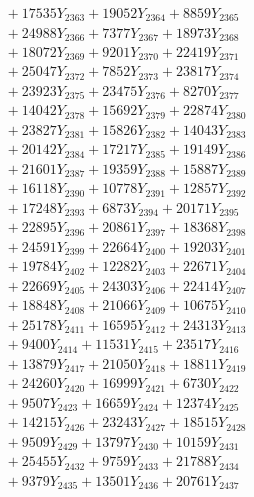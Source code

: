 \documentclass[a4paper,10pt]{article}
\begin{document}
{\begin{align}
&\;  + 17535 Y_{2363} + 19052 Y_{2364} + 8859 Y_{2365} \\[0.3ex]
&\;  + 24988 Y_{2366} + 7377 Y_{2367} + 18973 Y_{2368} \\[0.5ex]\allowbreak
&\;  + 18072 Y_{2369} + 9201 Y_{2370} + 22419 Y_{2371} \\[0.3ex]
&\;  + 25047 Y_{2372} + 7852 Y_{2373} + 23817 Y_{2374} \\[0.3ex]
&\;  + 23923 Y_{2375} + 23475 Y_{2376} + 8270 Y_{2377} \\[0.3ex]
&\;  + 14042 Y_{2378} + 15692 Y_{2379} + 22874 Y_{2380} \\[0.3ex]
&\;  + 23827 Y_{2381} + 15826 Y_{2382} + 14043 Y_{2383} \\[0.3ex]
&\;  + 20142 Y_{2384} + 17217 Y_{2385} + 19149 Y_{2386} \\[0.3ex]
&\;  + 21601 Y_{2387} + 19359 Y_{2388} + 15887 Y_{2389} \\[0.3ex]
&\;  + 16118 Y_{2390} + 10778 Y_{2391} + 12857 Y_{2392} \\[0.3ex]
&\;  + 17248 Y_{2393} + 6873 Y_{2394} + 20171 Y_{2395} \\[0.3ex]
&\;  + 22895 Y_{2396} + 20861 Y_{2397} + 18368 Y_{2398} \\[0.5ex]\allowbreak
&\;  + 24591 Y_{2399} + 22664 Y_{2400} + 19203 Y_{2401} \\[0.3ex]
&\;  + 19784 Y_{2402} + 12282 Y_{2403} + 22671 Y_{2404} \\[0.3ex]
&\;  + 22669 Y_{2405} + 24303 Y_{2406} + 22414 Y_{2407} \\[0.3ex]
&\;  + 18848 Y_{2408} + 21066 Y_{2409} + 10675 Y_{2410} \\[0.3ex]
&\;  + 25178 Y_{2411} + 16595 Y_{2412} + 24313 Y_{2413} \\[0.3ex]
&\;  + 9400 Y_{2414} + 11531 Y_{2415} + 23517 Y_{2416} \\[0.3ex]
&\;  + 13879 Y_{2417} + 21050 Y_{2418} + 18811 Y_{2419} \\[0.3ex]
&\;  + 24260 Y_{2420} + 16999 Y_{2421} + 6730 Y_{2422} \\[0.3ex]
&\;  + 9507 Y_{2423} + 16659 Y_{2424} + 12374 Y_{2425} \\[0.3ex]
&\;  + 14215 Y_{2426} + 23243 Y_{2427} + 18515 Y_{2428} \\[0.5ex]\allowbreak
&\;  + 9509 Y_{2429} + 13797 Y_{2430} + 10159 Y_{2431} \\[0.3ex]
&\;  + 25455 Y_{2432} + 9759 Y_{2433} + 21788 Y_{2434} \\[0.3ex]
&\;  + 9379 Y_{2435} + 13501 Y_{2436} + 20761 Y_{2437} \\[0.3ex]

\end{align}}
\end{document}
